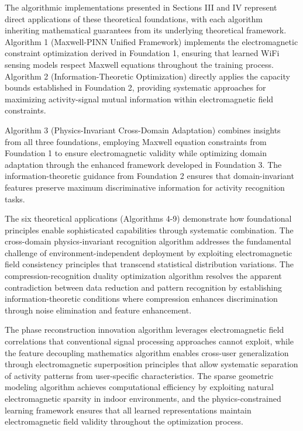 \documentclass[journal]{IEEEtran}
\begin{document}
The algorithmic implementations presented in Sections III and IV represent direct applications of these theoretical foundations, with each algorithm inheriting mathematical guarantees from its underlying theoretical framework. Algorithm 1 (Maxwell-PINN Unified Framework) implements the electromagnetic constraint optimization derived in Foundation 1, ensuring that learned WiFi sensing models respect Maxwell equations throughout the training process. Algorithm 2 (Information-Theoretic Optimization) directly applies the capacity bounds established in Foundation 2, providing systematic approaches for maximizing activity-signal mutual information within electromagnetic field constraints.

Algorithm 3 (Physics-Invariant Cross-Domain Adaptation) combines insights from all three foundations, employing Maxwell equation constraints from Foundation 1 to ensure electromagnetic validity while optimizing domain adaptation through the enhanced framework developed in Foundation 3. The information-theoretic guidance from Foundation 2 ensures that domain-invariant features preserve maximum discriminative information for activity recognition tasks.

The six theoretical applications (Algorithms 4-9) demonstrate how foundational principles enable sophisticated capabilities through systematic combination. The cross-domain physics-invariant recognition algorithm addresses the fundamental challenge of environment-independent deployment by exploiting electromagnetic field consistency principles that transcend statistical distribution variations. The compression-recognition duality optimization algorithm resolves the apparent contradiction between data reduction and pattern recognition by establishing information-theoretic conditions where compression enhances discrimination through noise elimination and feature enhancement.

The phase reconstruction innovation algorithm leverages electromagnetic field correlations that conventional signal processing approaches cannot exploit, while the feature decoupling mathematics algorithm enables cross-user generalization through electromagnetic superposition principles that allow systematic separation of activity patterns from user-specific characteristics. The sparse geometric modeling algorithm achieves computational efficiency by exploiting natural electromagnetic sparsity in indoor environments, and the physics-constrained learning framework ensures that all learned representations maintain electromagnetic field validity throughout the optimization process.
\end{document}
